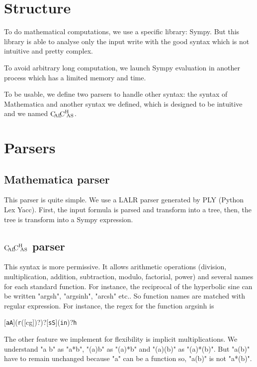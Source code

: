 \section{Structure}

To do mathematical computations, we use a specific library: Sympy. But this library is able to analyse only the input write with the good syntax which is not intuitive and pretty complex.

To avoid arbitrary long computation, we launch Sympy evaluation in another process which has a limited memory and time.

To be usable, we define two parsers to handle other syntax: the syntax of Mathematica and another syntax we defined, which is designed to be intuitive and we named $\text{C}\hspace{-2pt}_{\text{AL}}\hspace{-3pt}\text{C}^{\text{H}}{\hspace{-4pt}}_\text{AS}$.

\section{Parsers}

\subsection{Mathematica parser}

This parser is quite simple. We use a LALR parser generated by PLY (Python Lex Yacc). First, the input formula is parsed and transform into a tree, then, the tree is transform into a Sympy expression.

\subsection{\texorpdfstring{$\text{C}\hspace{-2pt}_{\text{AL}}\hspace{-3pt}\text{C}^{\text{H}}{\hspace{-4pt}}_\text{AS}$}{CalChAS} parser}

This syntax is more permissive. It allows arithmetic operations (division, multiplication, addition, subtraction, modulo, factorial, power) and several names for each standard function. For instance, the 
reciprocal of the hyperbolic sine can be written "argsh", "argsinh", "arcsh" etc.. So function names are matched with regular expression. For instance, the regex for the function argsinh is \begin{center}[\texttt{aA}](\texttt{r}([cg])?)?[\texttt{sS}](\texttt{in})?\texttt{h}\end{center}

The other feature we implement for flexibility is implicit multiplications. We understand "a b" as "a*b", "(a)b" as "(a)*b" and "(a)(b)" as "(a)*(b)". But "a(b)" have to remain unchanged because "a" can be a function so, "a(b)" is not "a*(b)".

